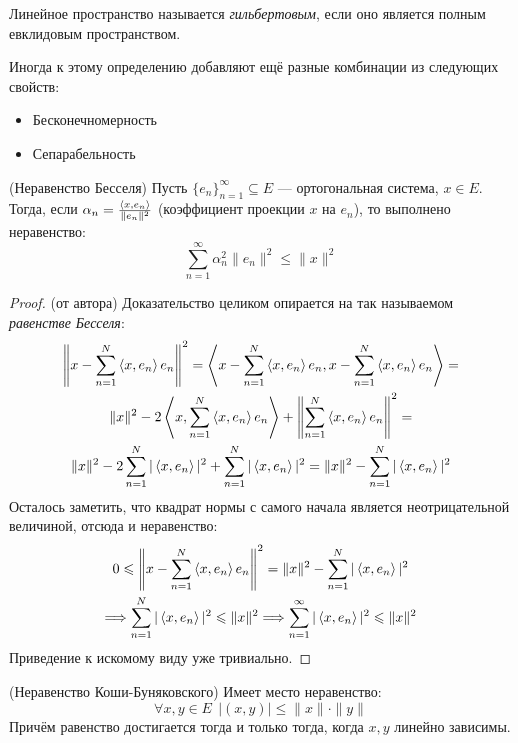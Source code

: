 \begin{definition}
	Линейное пространство называется \textit{гильбертовым}, если оно является полным евклидовым пространством.
\end{definition}

\begin{note}
	Иногда к этому определению добавляют ещё разные комбинации из следующих свойств:
	\begin{itemize}
		\item Бесконечномерность
		
		\item Сепарабельность
	\end{itemize}
\end{note}

\begin{reminder} (Неравенство Бесселя)
	Пусть $\{e_n\}_{n = 1}^\infty \subseteq E$ --- ортогональная система, $x \in E$. Тогда, если $\alpha_n = \frac{\left\langle x, e_n\right\rangle}{\|e_n\|^2}$ (коэффициент проекции $x$ на $e_n$), то выполнено неравенство:
	\[
		\sum_{n = 1}^\infty \alpha_n^2\|e_n\|^2 \le \|x\|^2
	\]
\end{reminder}

\begin{proof} (от автора)
	Доказательство целиком опирается на так называемом \textit{равенстве Бесселя}:
	\begin{multline*}
		\left\|x - \sum_{n = 1}^N \left\langle x, e_n\right\rangle e_n\right\|^2 = \left\langle x - \sum_{n = 1}^N \left\langle x, e_n\right\rangle e_n, x - \sum_{n = 1}^N \left\langle x, e_n\right\rangle e_n\right\rangle =
		\\
		\|x\|^2 - 2\left\langle x, \sum_{n = 1}^N \left\langle x, e_n\right\rangle e_n\right\rangle + \left\|\sum_{n = 1}^N \left\langle x, e_n\right\rangle e_n\right\|^2 =
		\\
		\|x\|^2 - 2\sum_{n = 1}^N |\left\langle x, e_n\right\rangle|^2 + \sum_{n = 1}^N |\left\langle x, e_n\right\rangle|^2 = \|x\|^2 - \sum_{n = 1}^N |\left\langle x, e_n\right\rangle|^2
	\end{multline*}
	Осталось заметить, что квадрат нормы с самого начала является неотрицательной величиной, отсюда и неравенство:
	\begin{multline*}
		0 \leqslant \left\|x - \sum_{n = 1}^N \left\langle x, e_n\right\rangle e_n\right\|^2 = \|x\|^2 - \sum_{n = 1}^N |\left\langle x, e_n\right\rangle|^2
		\\
		\Longrightarrow \sum_{n = 1}^N |\left\langle x, e_n\right\rangle|^2 \leqslant \|x\|^2 \Longrightarrow \sum_{n = 1}^\infty |\left\langle x, e_n\right\rangle|^2 \leqslant \|x\|^2
	\end{multline*}
	Приведение к искомому виду уже тривиально.
\end{proof}

\begin{proposition} (Неравенство Коши-Буняковского)
	Имеет место неравенство:
	\[
		\forall x, y \in E\ \ |(x, y)| \le \|x\| \cdot \|y\|
	\]
	Причём равенство достигается тогда и только тогда, когда $x, y$ линейно зависимы.
\end{proposition}

